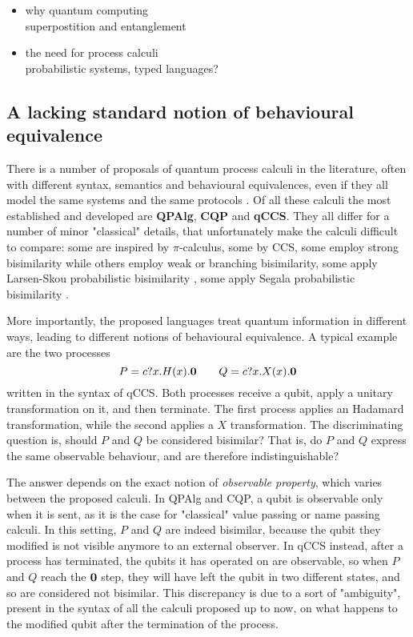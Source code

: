 \begin{itemize}
\item why quantum computing \\superpostition and entanglement

\item the need for process calculi \\ probabilistic systems, typed languages?
\end{itemize}

\subsection*{A lacking standard notion of behavioural equivalence}

There is a number of proposals of quantum process calculi in the literature, often with different syntax, semantics and behavioural equivalences, even if they all model the same systems and the same protocols \cite{lalireProcessAlgebraicApproach2004, gayCommunicatingQuantumProcesses2005, fengProbabilisticBisimulationsQuantum2007, yingAlgebraQuantumProcesses2010, wangProbabilisticProcessAlgebra2019}. Of all these calculi the most established and developed are \textbf{QPAlg}, \textbf{CQP} and \textbf{qCCS}. They all differ for a number of minor "classical" details, that unfortunately make the calculi difficult to compare: some are inspired by $\pi$-calculus, some by CCS, some employ strong bisimilarity while others employ weak or branching bisimilarity, some apply Larsen-Skou probabilistic bisimilarity \cite{larsenBisimulationProbabilisticTesting1991}, some apply Segala probabilistic bisimilarity \cite{segalaProbabilisticSimulationsProbabilistic1994}.

More importantly, the proposed languages treat quantum information in different ways, leading to different notions of behavioural equivalence. 
A typical example are the two processes 
\[P = c?x.H(x).\mathbf{0} \qquad Q = c?x.X(x).\mathbf{0}\]
written in the syntax of qCCS. Both processes receive a qubit, apply a unitary transformation on it, and then terminate. The first process applies an Hadamard transformation, while the second applies a $X$ transformation. The discriminating question is, should $P$ and $Q$ be considered bisimilar? That is, do $P$ and $Q$ express the same observable behaviour, and are therefore indistinguishable? 

The answer depends on the exact notion of \textit{observable property}, which varies between the proposed calculi. In QPAlg and CQP, a qubit is observable only when it is sent, as it is the case for "classical" value passing or name passing calculi. In this setting, $P$ and $Q$ are indeed bisimilar, because the qubit they modified is not visible anymore to an external observer. In qCCS instead, after a process has terminated, the qubits it has operated on are observable, so when $P$ and $Q$ reach the $\mathbf{0}$ step, they will have left the qubit in two different states, and so are considered not bisimilar. This discrepancy is due to a sort of "ambiguity", present in the syntax of all the calculi proposed up to now, on what happens to the modified qubit after the termination of the process. 
 
